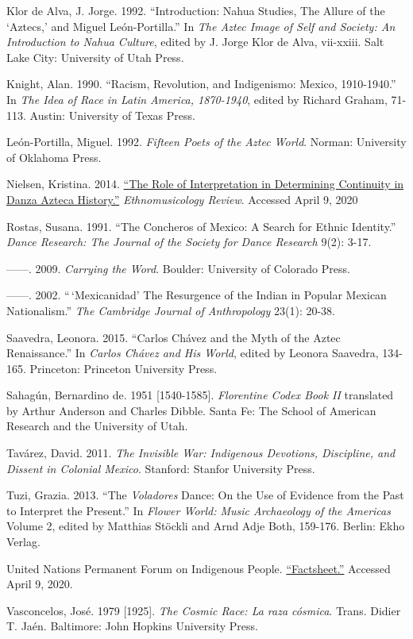 \documentclass[twoside]{article}
\begin{document}
\begin{hangparas}{15pt}{1}
 Klor de Alva, J. Jorge. 1992. ``Introduction: Nahua Studies,
The Allure of the `Aztecs,' and Miguel León-Portilla.'' In \emph{The
Aztec Image of Self and Society: An Introduction to Nahua Culture},
edited by J. Jorge Klor de Alva, vii-xxiii. Salt Lake City: University
of Utah Press.

 Knight, Alan. 1990. ``Racism, Revolution, and Indigenismo:
Mexico, 1910-1940.'' In \emph{The Idea of Race in Latin America,
1870-1940}, edited by Richard Graham, 71-113. Austin: University of
Texas Press.

 León-Portilla, Miguel. 1992. \emph{Fifteen Poets of the Aztec
World}. Norman: University of Oklahoma Press.

 Nielsen, Kristina. 2014.
\href{https://ethnomusicologyreview.ucla.edu/content/role-interpretation-determining-continuity-danza-azteca-history}{``The
Role of Interpretation in Determining Continuity in Danza Azteca
History.''} \emph{Ethnomusicology Review}. Accessed April 9, 2020

 Rostas, Susana. 1991. ``The Concheros of Mexico: A Search for
Ethnic Identity.'' \emph{Dance Research: The Journal of the Society for
Dance Research} 9(2): 3-17.

------. 2009. \emph{Carrying the Word}. Boulder:
University of Colorado Press.

------. 2002. ``\,`Mexicanidad' The Resurgence of the
Indian in Popular Mexican Nationalism.'' \emph{The Cambridge Journal of
Anthropology} 23(1): 20-38.

 Saavedra, Leonora. 2015. ``Carlos Chávez and the Myth of the
Aztec Renaissance.'' In \emph{Carlos Chávez and His World}, edited by
Leonora Saavedra, 134-165. Princeton: Princeton University Press.

 Sahagún, Bernardino de. 1951 {[}1540-1585{]}.
\emph{Florentine Codex Book II} translated by Arthur Anderson and
Charles Dibble. Santa Fe: The School of American Research and the
University of Utah.

 Tavárez, David. 2011. \emph{The Invisible War: Indigenous
Devotions, Discipline, and Dissent in Colonial Mexico}. Stanford:
Stanfor University Press.

 Tuzi, Grazia. 2013. ``The \emph{Voladores} Dance: On the Use
of Evidence from the Past to Interpret the Present.'' In \emph{Flower
World: Music Archaeology of the Americas} Volume 2, edited by Matthias
Stöckli and Arnd Adje Both, 159-176. Berlin: Ekho Verlag.

 United Nations Permanent Forum on Indigenous People.
\href{https://www.un.org/esa/socdev/unpfii/documents/5session_factsheet1.pdf}{``Factsheet.''}
Accessed April 9, 2020.

 Vasconcelos, José. 1979 {[}1925{]}. \emph{The Cosmic Race: La
raza cósmica}. Trans. Didier T. Jaén. Baltimore: John Hopkins University
Press.
\end{hangparas}
\end{document}
